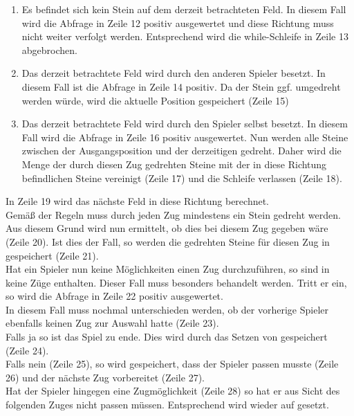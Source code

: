 \begin{enumerate}
\setcounter{enumi}{0}
\item Es befindet sich kein Stein auf dem derzeit betrachteten Feld. In diesem Fall wird die Abfrage in Zeile 12 positiv ausgewertet und diese Richtung muss nicht weiter verfolgt werden. Entsprechend wird die while-Schleife in Zeile 13 abgebrochen.
\item Das derzeit betrachtete Feld wird durch den anderen Spieler besetzt. In diesem Fall ist die Abfrage in Zeile 14 positiv. Da der Stein ggf. umgedreht werden würde, wird die aktuelle Position gespeichert (Zeile 15)
\item Das derzeit betrachtete Feld wird durch den Spieler selbst besetzt. In diesem Fall wird die Abfrage in Zeile 16 positiv ausgewertet. Nun werden alle Steine zwischen der Ausgangsposition und der derzeitigen gedreht. Daher wird die Menge der durch diesen Zug gedrehten Steine mit der in diese Richtung befindlichen Steine vereinigt (Zeile 17) und die Schleife verlassen (Zeile 18).
\end{enumerate}
In Zeile 19 wird das nächste Feld in diese Richtung berechnet.
\\Gemäß der Regeln muss durch jeden Zug mindestens ein Stein gedreht werden. Aus diesem Grund wird nun ermittelt, ob dies bei diesem Zug gegeben wäre (Zeile 20). Ist dies der Fall, so werden die gedrehten Steine für diesen Zug in  gespeichert (Zeile 21).
\\Hat ein Spieler nun keine Möglichkeiten einen Zug durchzuführen, so sind in \\ keine Züge enthalten. Dieser Fall muss besonders behandelt werden. Tritt er ein, so wird die Abfrage in Zeile 22 positiv ausgewertet.
\\In diesem Fall muss nochmal unterschieden werden, ob der vorherige Spieler ebenfalls keinen Zug zur Auswahl hatte (Zeile 23).
\\Falls ja so ist das Spiel zu ende. Dies wird durch das Setzen von  gespeichert (Zeile 24).
\\Falls nein (Zeile 25), so wird gespeichert, dass der Spieler passen musste (Zeile 26) und der nächste Zug vorbereitet (Zeile 27).
\\Hat der Spieler hingegen eine Zugmöglichkeit (Zeile 28) so hat er aus Sicht des folgenden Zuges nicht passen müssen. Entsprechend wird  wieder auf  gesetzt. 
\newpage
